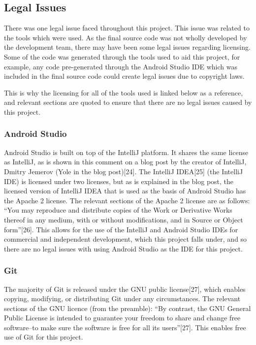 \documentclass{article}
\begin{document}
\subsection{Legal Issues}

There was one legal issue faced throughout this project. This issue was related to the tools which were used. As the final source code was not wholly developed by the development team, there may have been some legal issues regarding licensing. Some of the code was generated through the tools used to aid this project, for example, any code pre-generated through the Android Studio IDE which was included in the final source code could create legal issues due to copyright laws. \par

This is why the licensing for all of the tools used is linked below as a reference, and relevant sections are quoted to ensure that there are no legal issues caused by this project. \par

\subsubsection{Android Studio}

Android Studio is built on top of the IntelliJ platform. It shares the same license as IntelliJ, as is shown in this comment on a blog post by the creator of IntelliJ, Dmitry Jemerov (Yole in the blog post)[24]. The IntelliJ IDEA[25] (the IntelliJ IDE) is licensed under two licenses, but as is explained in the blog post, the licensed version of IntelliJ IDEA that is used as the basis of Android Studio has the Apache 2 license. The relevant sections of the Apache 2 license are as follows: ``You may reproduce and distribute copies of the Work or Derivative Works thereof in any medium, with or without modifications, and in Source or Object form''[26]. This allows for the use of the IntelliJ and Android Studio IDEs for commercial and independent development, which this project falls under, and so there are no legal issues with using Android Studio as the IDE for this project. \par

\subsubsection{Git}

The majority of Git is released under the GNU public license[27], which enables copying, modifying, or distributing Git under any circumstances. The relevant sections of the GNU licence (from the preamble): ``By contrast, the GNU General Public License is intended to guarantee your freedom to share and change free software--to make sure the software is free for all its users''[27]. This enables free use of Git for this project. \par
\end{document}
